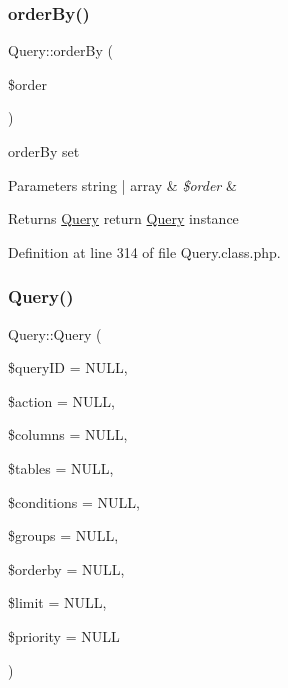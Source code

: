 \subsubsection{\texorpdfstring{order\+By()}{orderBy()}}
{\footnotesize\ttfamily Query\+::order\+By (\begin{DoxyParamCaption}\item[{}]{\$order }\end{DoxyParamCaption})}

order\+By set 
\begin{DoxyParams}[1]{Parameters}
string | array & {\em \$order} & \\
\hline
\end{DoxyParams}
\begin{DoxyReturn}{Returns}
\hyperlink{classQuery}{Query} return \hyperlink{classQuery}{Query} instance 
\end{DoxyReturn}


Definition at line 314 of file Query.\+class.\+php.

\mbox{\label{classQuery_a18345a4b454ee480c261c15c4338768e}} 
\subsubsection{\texorpdfstring{Query()}{Query()}}
{\footnotesize\ttfamily Query\+::\+Query (\begin{DoxyParamCaption}\item[{}]{\$query\+ID = {\ttfamily NULL},  }\item[{}]{\$action = {\ttfamily NULL},  }\item[{}]{\$columns = {\ttfamily NULL},  }\item[{}]{\$tables = {\ttfamily NULL},  }\item[{}]{\$conditions = {\ttfamily NULL},  }\item[{}]{\$groups = {\ttfamily NULL},  }\item[{}]{\$orderby = {\ttfamily NULL},  }\item[{}]{\$limit = {\ttfamily NULL},  }\item[{}]{\$priority = {\ttfamily NULL} }\end{DoxyParamCaption})}

